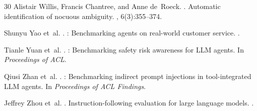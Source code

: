\documentclass[11pt,a4paper]{article}
\begin{document}
\begin{thebibliography}{30}
Alistair Willis, Francis Chantree, and Anne de~Roeck.
.
\newblock Automatic identification of nocuous ambiguity.
, 6(3):355--374.

Shunyu Yao et~al.
.
: Benchmarking agents on real-world customer service.
.

Tianle Yuan et~al.
.
: Benchmarking safety risk awareness for {LLM} agents.
\newblock In {\em Proceedings of ACL}.

Qiusi Zhan et~al.
.
: Benchmarking indirect prompt injections in tool-integrated {LLM} agents.
\newblock In {\em Proceedings of ACL Findings}.

Jeffrey Zhou et~al.
.
\newblock Instruction-following evaluation for large language models.
.

\end{thebibliography}
\end{document}
